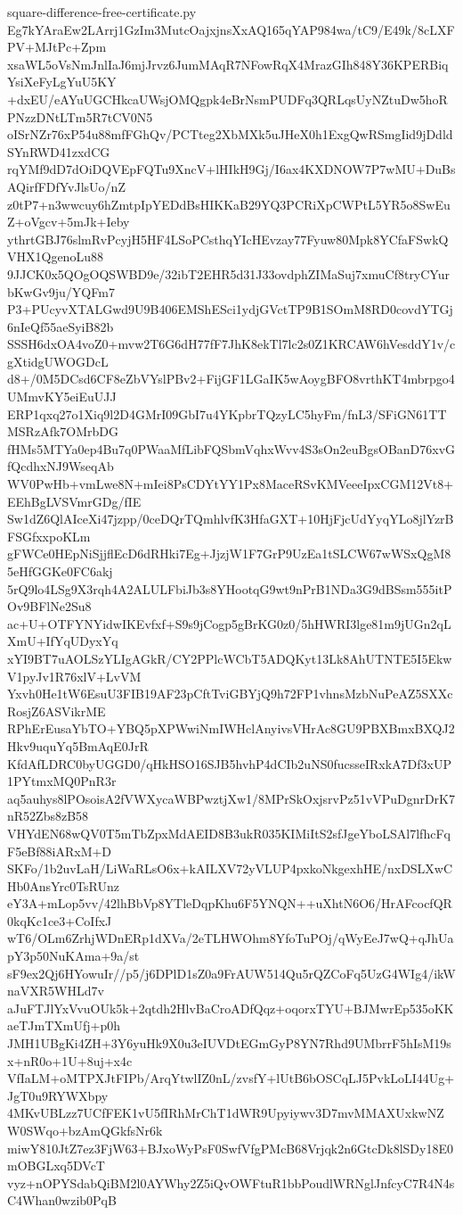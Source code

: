 \documentclass[11pt]{article}
\theoremstyle{definition}
\theoremstyle{remark}
\begin{document}
\begin{filecontents*}[overwrite]{square-difference-free-certificate.py}
Eg7kYAraEw2LArrj1GzIm3MutcOajxjnsXxAQ165qYAP984wa/tC9/E49k/8cLXFPV+MJtPc+Zpm
xsaWL5oVsNmJnlIaJ6mjJrvz6JumMAqR7NFowRqX4MrazGIh848Y36KPERBiqYsiXeFyLgYuU5KY
+dxEU/eAYuUGCHkcaUWsjOMQgpk4eBrNsmPUDFq3QRLqsUyNZtuDw5hoRPNzzDNtLTm5R7tCV0N5
oISrNZr76xP54u88mfFGhQv/PCTteg2XbMXk5uJHeX0h1ExgQwRSmgIid9jDdldSYnRWD41zxdCG
rqYMf9dD7dOiDQVEpFQTu9XncV+lHIkH9Gj/I6ax4KXDNOW7P7wMU+DuBsAQirfFDfYvJlsUo/nZ
z0tP7+n3wwcuy6hZmtpIpYEDdBsHIKKaB29YQ3PCRiXpCWPtL5YR5o8SwEuZ+oVgcv+5mJk+Ieby
ythrtGBJ76slmRvPcyjH5HF4LSoPCsthqYIcHEvzay77Fyuw80Mpk8YCfaFSwkQVHX1QgenoLu88
9JJCK0x5QOgOQSWBD9e/32ibT2EHR5d31J33ovdphZIMaSuj7xmuCf8tryCYurbKwGv9ju/YQFm7
P3+PUcyvXTALGwd9U9B406EMShESci1ydjGVctTP9B1SOmM8RD0covdYTGj6nIeQf55aeSyiB82b
SSSH6dxOA4voZ0+mvw2T6G6dH77fF7JhK8ekTl7lc2s0Z1KRCAW6hVesddY1v/cgXtidgUWOGDcL
d8+/0M5DCsd6CF8eZbVYslPBv2+FijGF1LGaIK5wAoygBFO8vrthKT4mbrpgo4UMmvKY5eiEuUJJ
ERP1qxq27o1Xiq9l2D4GMrI09GbI7u4YKpbrTQzyLC5hyFm/fnL3/SFiGN61TTMSRzAfk7OMrbDG
fHMs5MTYa0ep4Bu7q0PWaaMfLibFQSbmVqhxWvv4S3sOn2euBgsOBanD76xvGfQcdhxNJ9WseqAb
WV0PwHb+vmLwe8N+mIei8PsCDYtYY1Px8MaceRSvKMVeeeIpxCGM12Vt8+EEhBgLVSVmrGDg/fIE
Sw1dZ6QlAIceXi47jzpp/0ceDQrTQmhlvfK3HfaGXT+10HjFjcUdYyqYLo8jlYzrBFSGfxxpoKLm
gFWCe0HEpNiSjjflEcD6dRHki7Eg+JjzjW1F7GrP9UzEa1tSLCW67wWSxQgM85eHfGGKe0FC6akj
5rQ9lo4LSg9X3rqh4A2ALULFbiJb3s8YHootqG9wt9nPrB1NDa3G9dBSsm555itPOv9BFlNe2Su8
ac+U+OTFYNYidwIKEvfxf+S9s9jCogp5gBrKG0z0/5hHWRI3lge81m9jUGn2qLXmU+IfYqUDyxYq
xYI9BT7uAOLSzYLIgAGkR/CY2PPlcWCbT5ADQKyt13Lk8AhUTNTE5I5EkwV1pyJv1R76xlV+LvVM
Yxvh0He1tW6EsuU3FIB19AF23pCftTviGBYjQ9h72FP1vhnsMzbNuPeAZ5SXXcRosjZ6ASVikrME
RPhErEusaYbTO+YBQ5pXPWwiNmIWHclAnyivsVHrAc8GU9PBXBmxBXQJ2Hkv9uquYq5BmAqE0JrR
KfdAfLDRC0byUGGD0/qHkHSO16SJB5hvhP4dCIb2uNS0fucsseIRxkA7Df3xUP1PYtmxMQ0PnR3r
aq5auhys8lPOsoisA2fVWXycaWBPwztjXw1/8MPrSkOxjsrvPz51vVPuDgnrDrK7nR52Zbs8zB58
VHYdEN68wQV0T5mTbZpxMdAEID8B3ukR035KIMiItS2sfJgeYboLSAl7lfhcFqF5eBf88iARxM+D
SKFo/1b2uvLaH/LiWaRLsO6x+kAILXV72yVLUP4pxkoNkgexhHE/nxDSLXwCHb0AnsYrc0TsRUnz
eY3A+mLop5vv/42lhBbVp8YTleDqpKhu6F5YNQN++uXhtN6O6/HrAFcocfQR0kqKc1ce3+CoIfxJ
wT6/OLm6ZrhjWDnERp1dXVa/2eTLHWOhm8YfoTuPOj/qWyEeJ7wQ+qJhUapY3p50NuKAma+9a/st
sF9ex2Qj6HYowuIr//p5/j6DPlD1sZ0a9FrAUW514Qu5rQZCoFq5UzG4WIg4/ikWnaVXR5WHLd7v
aJuFTJlYxVvuOUk5k+2qtdh2HlvBaCroADfQqz+oqorxTYU+BJMwrEp535oKKaeTJmTXmUfj+p0h
JMH1UBgKi4ZH+3Y6yuHk9X0u3eIUVDtEGmGyP8YN7Rhd9UMbrrF5hIsM19sx+nR0o+1U+8uj+x4c
VfIaLM+oMTPXJtFIPb/ArqYtwlIZ0nL/zvsfY+lUtB6bOSCqLJ5PvkLoLI44Ug+JgT0u9RYWXbpy
4MKvUBLzz7UCfFEK1vU5fIRhMrChT1dWR9Upyiywv3D7mvMMAXUxkwNZW0SWqo+bzAmQGkfsNr6k
miwY810JtZ7ez3FjW63+BJxoWyPsF0SwfVfgPMcB68Vrjqk2n6GtcDk8lSDy18E0mOBGLxq5DVcT
vyz+nOPYSdabQiBM2l0AYWhy2Z5iQvOWFtuR1bbPoudlWRNglJnfcyC7R4N4sC4Whan0wzib0PqB

\end{filecontents*}
\end{document}
